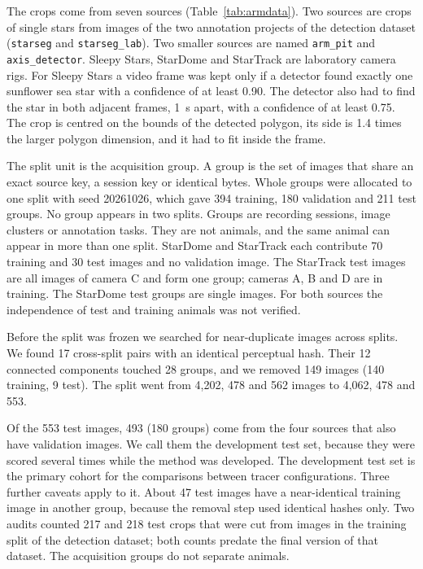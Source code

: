 The crops come from seven sources (Table~\ref{tab:armdata}).
Two sources are crops of single stars from images of the two annotation projects of the detection dataset (\texttt{starseg} and \texttt{starseg\_lab}).
Two smaller sources are named \texttt{arm\_pit} and \texttt{axis\_detector}. 
Sleepy Stars, StarDome and StarTrack are laboratory camera rigs. 
For Sleepy Stars a video frame was kept only if a detector found exactly one sunflower sea star with a confidence of at least 0.90.
The detector also had to find the star in both adjacent frames, 1~s apart, with a confidence of at least 0.75.
The crop is centred on the bounds of the detected polygon, its side is 1.4 times the larger polygon dimension, and it had to fit inside the frame.

The split unit is the acquisition group.
A group is the set of images that share an exact source key, a session key or identical bytes.
Whole groups were allocated to one split with seed 20261026, which gave 394 training, 180 validation and 211 test groups.
No group appears in two splits.
Groups are recording sessions, image clusters or annotation tasks.
They are not animals, and the same animal can appear in more than one split. 
StarDome and StarTrack each contribute 70 training and 30 test images and no validation image.
The StarTrack test images are all images of camera C and form one group; cameras A, B and D are in training.
The StarDome test groups are single images.
For both sources the independence of test and training animals was not verified.

Before the split was frozen we searched for near-duplicate images across splits.
We found 17 cross-split pairs with an identical perceptual hash.
Their 12 connected components touched 28 groups, and we removed 149 images (140 training, 9 test).
The split went from 4,202, 478 and 562 images to 4,062, 478 and 553.

Of the 553 test images, 493 (180 groups) come from the four sources that also have validation images.
We call them the development test set, because they were scored several times while the method was developed.
The development test set is the primary cohort for the comparisons between tracer configurations.
Three further caveats apply to it.
About 47 test images have a near-identical training image in another group, because the removal step used identical hashes only.
Two audits counted 217 and 218 test crops that were cut from images in the training split of the detection dataset; both counts predate the final version of that dataset.
The acquisition groups do not separate animals.

